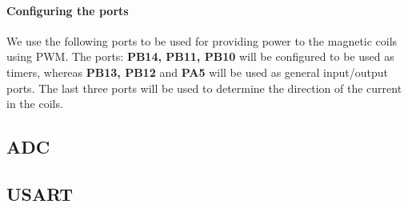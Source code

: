 \documentclass[11pt,a4paper]{report}
\begin{document}
\paragraph{Configuring the ports}

We use the following ports to be used for providing power to the magnetic coils using PWM. The ports: \textbf{PB14, PB11, PB10} will be configured to be used as timers, whereas \textbf{PB13, PB12} and \textbf{PA5} will be used as general input/output ports. The last three ports will be used to determine the direction of the current in the coils. 

\begin{table}[H]
\centering
{}
\caption{List of PWM Ports} 
\label{list_pwm}
\end{table}






\subsection{ADC}


\subsection{USART} 
\end{document}
